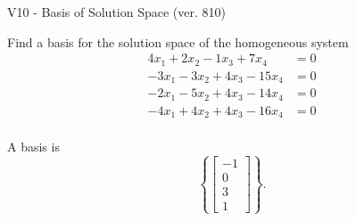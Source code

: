 \begin{exercise}
  \begin{exerciseTitle}V10 - Basis of Solution Space (ver. 810)\end{exerciseTitle}
  \begin{exerciseStatement}
    Find a basis for the solution space of the homogeneous system 
\begin{align*}
 4 x_ 1 + 2 x_ 2 -1 x_ 3 + 7 x_ 4 &= 0  \\ 
  -3 x_ 1 -3 x_ 2 + 4 x_ 3 -15 x_ 4 &= 0  \\ 
  -2 x_ 1 -5 x_ 2 + 4 x_ 3 -14 x_ 4 &= 0  \\ 
  -4 x_ 1 + 4 x_ 2 + 4 x_ 3 -16 x_ 4 &= 0  \\ 
 \end{align*}


 
  \end{exerciseStatement}

  \begin{exerciseAnswer}
   A basis is   
\[\left\{\left[\begin{array}{c}
-1 \\
0 \\
3 \\
1
\end{array}\right]\right\}.\]

  


  \end{exerciseAnswer}
\end{exercise}